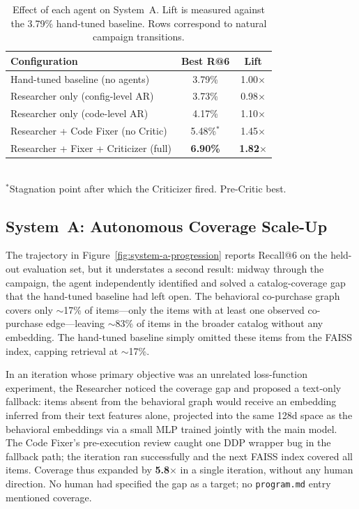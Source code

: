 \documentclass[conference]{IEEEtran}
\begin{document}
\begin{table}[t]
  \caption{Effect of each agent on System~A. Lift is measured against the 3.79\% hand-tuned baseline. Rows correspond to natural campaign transitions.}
  \label{tab:ablation}
  \centering
  \small
  \begin{tabular}{lcc}
    \toprule
    Configuration & Best R@6 & Lift \\
    \midrule
    Hand-tuned baseline (no agents)            & 3.79\%  & 1.00$\times$ \\
    Researcher only (config-level AR)          & 3.73\%  & 0.98$\times$ \\
    Researcher only (code-level AR)            & 4.17\%  & 1.10$\times$ \\
    Researcher + Code Fixer (no Critic)        & 5.48\%$^{*}$ & 1.45$\times$ \\
    Researcher + Fixer + Criticizer (full)     & \textbf{6.90\%} & \textbf{1.82$\times$} \\
    \bottomrule
  \end{tabular}
  \\[2pt]
  {\footnotesize $^{*}$Stagnation point after which the Criticizer fired. Pre-Critic best.}
\end{table}

\subsection{System~A: Autonomous Coverage Scale-Up}

The trajectory in Figure~\ref{fig:system-a-progression} reports Recall@6 on the held-out evaluation set, but it understates a second result: midway through the campaign, the agent independently identified and solved a catalog-coverage gap that the hand-tuned baseline had left open. The behavioral co-purchase graph covers only ${\sim}$17\% of items---only the items with at least one observed co-purchase edge---leaving ${\sim}$83\% of items in the broader catalog without any embedding. The hand-tuned baseline simply omitted these items from the FAISS index, capping retrieval at ${\sim}$17\%.

In an iteration whose primary objective was an unrelated loss-function experiment, the Researcher noticed the coverage gap and proposed a text-only fallback: items absent from the behavioral graph would receive an embedding inferred from their text features alone, projected into the same 128d space as the behavioral embeddings via a small MLP trained jointly with the main model. The Code Fixer's pre-execution review caught one DDP wrapper bug in the fallback path; the iteration ran successfully and the next FAISS index covered all items. Coverage thus expanded by \textbf{5.8$\times$} in a single iteration, without any human direction. No human had specified the gap as a target; no \texttt{program.md} entry mentioned coverage.
\end{document}
